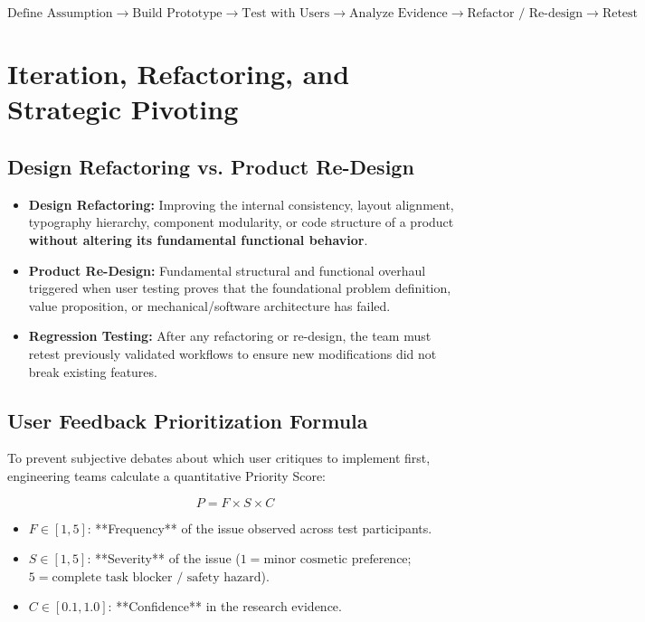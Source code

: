 \begin{keyequation}
\begin{equation}
\text{Define Assumption} \longrightarrow \text{Build Prototype} \longrightarrow \text{Test with Users} \longrightarrow \text{Analyze Evidence} \longrightarrow \text{Refactor / Re-design} \longrightarrow \text{Retest}
\end{equation}
\end{keyequation}

\section{Iteration, Refactoring, and Strategic Pivoting}

\subsection{Design Refactoring vs. Product Re-Design}
\begin{itemize}[leftmargin=1.2em, itemsep=3pt]
    \item \textbf{Design Refactoring:} Improving the internal consistency, layout alignment, typography hierarchy, component modularity, or code structure of a product \textbf{without altering its fundamental functional behavior}.
    \item \textbf{Product Re-Design:} Fundamental structural and functional overhaul triggered when user testing proves that the foundational problem definition, value proposition, or mechanical/software architecture has failed.
    \item \textbf{Regression Testing:} After any refactoring or re-design, the team must retest previously validated workflows to ensure new modifications did not break existing features.
\end{itemize}

\subsection{User Feedback Prioritization Formula}
To prevent subjective debates about which user critiques to implement first, engineering teams calculate a quantitative Priority Score:

\begin{keyequation}
\begin{equation}
P = F \times S \times C
\end{equation}
\begin{itemize}[leftmargin=1.2em, itemsep=2pt]
    \item $F \in [1, 5]$: **Frequency** of the issue observed across test participants.
    \item $S \in [1, 5]$: **Severity** of the issue ($1 = \text{minor cosmetic preference}$; $5 = \text{complete task blocker / safety hazard}$).
    \item $C \in [0.1, 1.0]$: **Confidence** in the research evidence.
\end{itemize}
\end{keyequation}

